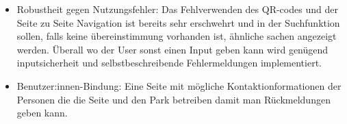 \documentclass[10pt]{article}
\begin{document}
\begin{itemize}
		\item Robustheit gegen Nutzungsfehler: Das Fehlverwenden des QR-codes und der Seite zu Seite Navigation ist bereits sehr erschwehrt und in der Suchfunktion sollen, falls keine übereinstimmung vorhanden ist, ähnliche sachen angezeigt werden. Überall wo der User sonst einen Input geben kann wird genügend inputsicherheit und selbstbeschreibende Fehlermeldungen implementiert.
		
		\item Benutzer:innen-Bindung: Eine Seite mit mögliche Kontaktionformationen der Personen die die Seite und den Park betreiben damit man Rückmeldungen geben kann. 
		
	\end{itemize}
	
	
	
\end{document}
